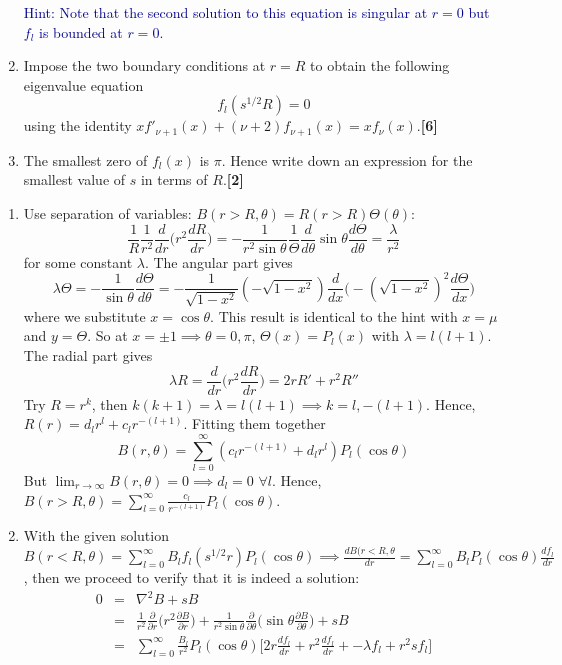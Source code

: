 \documentclass[a4paper]{article}
\begin{document}
\begin{qns}
\begin{enumerate}[label=(\roman*)]
\begin{mdframed}
\textcolor{darkblue}{Hint: Note that the second solution to this equation is singular at $r = 0$ but $f_l$ is bounded at $r = 0$.}
\end{mdframed}
\item Impose the two boundary conditions at $r = R$ to obtain the following eigenvalue equation
$$f_l(s^{1/2} R) = 0$$
using the identity $xf'_{\nu+1}(x)+(\nu+2)f_{\nu+1}(x)=xf_\nu(x)$.\hfill\textbf{[6]}
\item The smallest zero of $f_l(x)$ is $\pi$. Hence write down an expression for the smallest value of $s$ in terms of $R$.\hfill\textbf{[2]}
\end{enumerate}
\end{qns}
\begin{ans}\leavevmode
\begin{enumerate}[label=(\roman*)]
\item Use separation of variables: $B(r>R,\theta)=R(r>R)\Theta(\theta)$:
$$\frac{1}{R}\frac{1}{r^2}\frac{d}{dr}\bigg(r^2\frac{dR}{dr}\bigg)=-\frac{1}{r^2\sin\theta}\frac{1}{\Theta}\frac{d}{d\theta}\sin\theta\frac{d\Theta}{d\theta}=\frac{\lambda}{r^2}$$
for some constant $\lambda$. The angular part gives
$$\lambda\Theta=-\frac{1}{\sin\theta}\frac{d\Theta}{d\theta}=-\frac{1}{\sqrt{1-x^2}}(-\sqrt{1-x^2})\frac{d}{dx}\bigg(-(\sqrt{1-x^2})^2\frac{d\Theta}{dx}\bigg)$$
where we substitute $x=\cos\theta$. This result is identical to the hint with $x=\mu$ and $y=\Theta$. So at $x=\pm1\implies\theta=0,\pi$, $\Theta(x)=P_l(x)$ with $\lambda=l(l+1)$. The radial part gives
$$\lambda R=\frac{d}{dr}\bigg(r^2\frac{dR}{dr}\bigg)=2rR'+r^2R''$$
Try $R=r^k$, then $k(k+1)=\lambda=l(l+1)\implies k=l,-(l+1)$. Hence, $R(r)=d_lr^l+c_lr^{-(l+1)}$. Fitting them together
$$B(r,\theta)=\sum_{l=0}^\infty(c_lr^{-(l+1)}+d_lr^l)P_l(\cos\theta)$$
But $\lim_{r\rightarrow\infty}B(r,\theta)=0\implies d_l=0$ $\forall l$. Hence, $B(r>R,\theta)=\sum_{l=0}^\infty\frac{c_l}{r^{-(l+1)}}P_l(\cos\theta)$.
\item With the given solution $B(r<R,\theta)=\sum_{l=0}^\infty B_lf_l(s^{1/2}r)P_l(\cos\theta)\implies\frac{dB(r<R,\theta}{dr}=\sum_{l=0}^\infty B_lP_l(\cos\theta)\frac{df_l}{dr}$, then we proceed to verify that it is indeed a solution:
\begin{eqnarray}
0&=&\nabla^2B+sB\nonumber\\&=&\frac{1}{r^2}\frac{\partial}{\partial r}\bigg(r^2\frac{\partial B}{\partial r}\bigg)+\frac{1}{r^2\sin\theta}\frac{\partial}{\partial\theta}\bigg(\sin\theta\frac{\partial B}{\partial\theta}\bigg)+sB\nonumber\\&=&\sum_{l=0}^\infty\frac{B_l}{r^2}P_l(\cos\theta)\bigg[2r\frac{df_l}{dr}+r^2\frac{df_l}{dr}+-\lambda f_l+r^2sf_l\bigg]\nonumber

\end{eqnarray}
\end{enumerate}
\end{ans}
\end{document}
